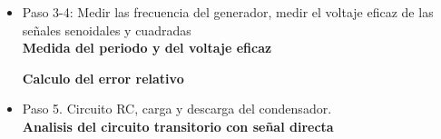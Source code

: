 \documentclass[twoside,twocolumn]{article}
\begin{document}
\begin{itemize}
  \item Paso 3-4: Medir las frecuencia del generador, medir el voltaje eficaz de las señales senoidales y cuadradas\\
\newpage
     \textbf{Medida del periodo y del voltaje eficaz}
    \begin{table}[h]
    \centering
    \caption{Medida del periodo y del voltaje eficaz para señales senoidales y cuadradas}
    \label{tab:tabla de resistencia}
    \end{table}
    
\vspace{1cm}   
    \textbf{Calculo del error relativo}
    \begin{table}[h]
    \centering
    \caption{Errores relativos del voltaje eficaz}
    \label{tab:tabla de resistencia}
    \end{table}
    
\vspace{0.5 cm} 
\item Paso 5. Circuito RC, carga y descarga del condensador.\\

    \textbf{Analisis del circuito transitorio con señal directa}
    \begin{table}[h]
    \centering
    \caption{Calculo de la constante de tiempo en un circuito transitorio de señal directa}
    \label{tab:tabla de resistencia}
    \end{table}


\end{itemize}
\end{document}

